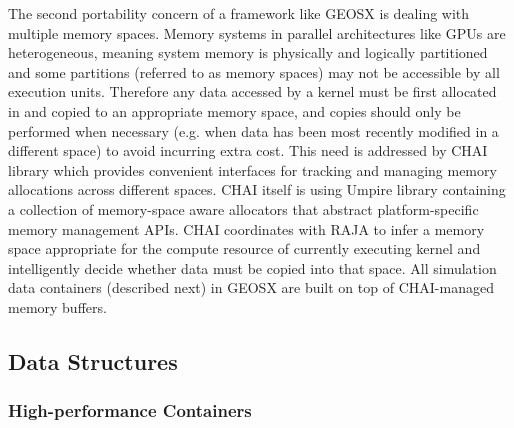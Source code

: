 The second portability concern of a framework like GEOSX is dealing with multiple memory spaces.   Memory systems in parallel architectures like GPUs are heterogeneous, meaning system memory is physically and logically partitioned and some partitions (referred to as memory spaces) may not be accessible by all execution units.   Therefore any data accessed by a kernel must be first allocated in and copied to an appropriate memory space, and copies should only be performed when necessary (e.g. when data has been most recently modified in a different space) to avoid incurring extra cost.   This need is addressed by CHAI library \cite{chai} which provides convenient interfaces for tracking and managing memory allocations across different spaces.   CHAI itself is using Umpire library \cite{Beckingsale2020} containing a collection of memory-space aware allocators that abstract platform-specific memory management APIs.   CHAI coordinates with RAJA to infer a memory space appropriate for the compute resource of currently executing kernel and intelligently decide whether data must be copied into that space.   All simulation data containers (described next) in GEOSX are built on top of CHAI-managed memory buffers.

\subsection{Data Structures}
\label{subsec:geosx_components_data}

\subsubsection{High-performance Containers}

